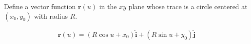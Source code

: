 Define a vector function $\boldsymbol{r}(u)$ in the $xy$ plane whose trace is a circle centered at $(x_0, y_0)$ with radius $R$.

\begin{solution}
\begin{align*}
    \boldsymbol{r}(u) = \left(R\cos u + x_0\right)\hat{\boldsymbol{i}} + \left(R\sin u + y_0\right)\hat{\boldsymbol{j}}
\end{align*}
\end{solution}